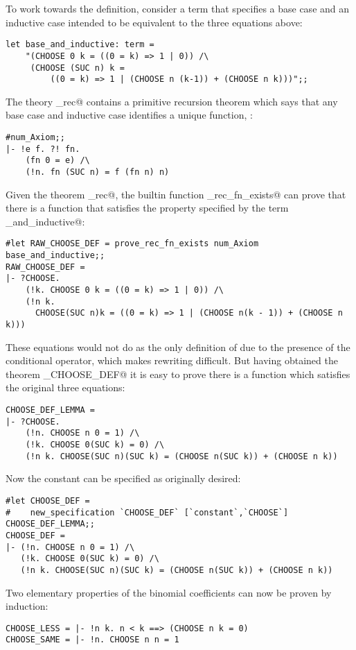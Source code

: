 To work towards the definition, consider a term that specifies a base case 
and an inductive case intended to be equivalent to the three equations above:
\begin{session}
\begin{verbatim}
let base_and_inductive: term =
    "(CHOOSE 0 k = ((0 = k) => 1 | 0)) /\
     (CHOOSE (SUC n) k =
         ((0 = k) => 1 | (CHOOSE n (k-1)) + (CHOOSE n k)))";;
\end{verbatim}
\end{session}
The theory \verb@prim_rec@ contains a primitive recursion theorem which 
says that any base case and inductive case identifies a unique function, 
\verb@fn@:
\begin{session}
\begin{verbatim}
#num_Axiom;;
|- !e f. ?! fn.
    (fn 0 = e) /\
    (!n. fn (SUC n) = f (fn n) n)
\end{verbatim}
\end{session}
Given the theorem \verb@prim_rec@, the builtin function 
\verb@prove_rec_fn_exists@ can prove that there is a function that satisfies 
the property specified by the term \verb@base_and_inductive@:
\begin{session}
\begin{verbatim}
#let RAW_CHOOSE_DEF = prove_rec_fn_exists num_Axiom base_and_inductive;;
RAW_CHOOSE_DEF = 
|- ?CHOOSE.
    (!k. CHOOSE 0 k = ((0 = k) => 1 | 0)) /\
    (!n k.
      CHOOSE(SUC n)k = ((0 = k) => 1 | (CHOOSE n(k - 1)) + (CHOOSE n k)))
\end{verbatim}
\end{session}
These equations would not do as the only definition of \verb@CHOOSE@ due 
to the presence of the conditional operator, which makes rewriting 
difficult.  But having obtained the theorem \verb@RAW_CHOOSE_DEF@ it is 
easy to prove there is a function which satisfies the original three 
equations:
\begin{session}
\begin{verbatim}
CHOOSE_DEF_LEMMA = 
|- ?CHOOSE.
    (!n. CHOOSE n 0 = 1) /\
    (!k. CHOOSE 0(SUC k) = 0) /\
    (!n k. CHOOSE(SUC n)(SUC k) = (CHOOSE n(SUC k)) + (CHOOSE n k))
\end{verbatim}
\end{session}
Now the constant \verb@CHOOSE@ can be specified as originally desired:
\begin{session}
\begin{verbatim}
#let CHOOSE_DEF =
#    new_specification `CHOOSE_DEF` [`constant`,`CHOOSE`] CHOOSE_DEF_LEMMA;;
CHOOSE_DEF = 
|- (!n. CHOOSE n 0 = 1) /\
   (!k. CHOOSE 0(SUC k) = 0) /\
   (!n k. CHOOSE(SUC n)(SUC k) = (CHOOSE n(SUC k)) + (CHOOSE n k))
\end{verbatim}
\end{session}
Two elementary properties of the binomial coefficients can now be proven
by induction:
\begin{session}
\begin{verbatim}
CHOOSE_LESS = |- !n k. n < k ==> (CHOOSE n k = 0)
CHOOSE_SAME = |- !n. CHOOSE n n = 1
\end{verbatim}
\end{session}

